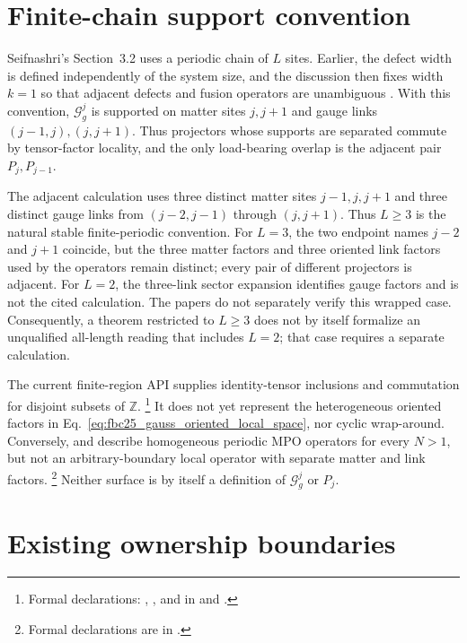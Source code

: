 \documentclass{article}
\begin{document}
\section{Finite-chain support convention}

Seifnashri's Section~3.2 uses a periodic chain of $L$ sites.  Earlier, the
defect width is defined independently of the system size, and the discussion
then fixes width $k=1$ so that adjacent defects and fusion operators are
unambiguous \cite[arXiv source lines~555--584 and 602--760]
{Seifnashri2024LSM}.  With this convention, $\mathcal G^j_g$ is supported on
matter sites $j,j+1$ and gauge links $(j-1,j),(j,j+1)$.  Thus projectors whose
supports are separated commute by tensor-factor locality, and the only
load-bearing overlap is the adjacent pair $P_j,P_{j-1}$.

The adjacent calculation uses three distinct matter sites
$j-1,j,j+1$ and three distinct gauge links from $(j-2,j-1)$ through
$(j,j+1)$.  Thus $L\geq3$ is the natural stable finite-periodic convention.
For $L=3$, the two endpoint names $j-2$ and $j+1$ coincide, but the three
matter factors and three oriented link factors used by the operators remain
distinct; every pair of different projectors is adjacent.  For $L=2$, the
three-link sector expansion identifies gauge factors and is not the cited
calculation.  The papers do not separately verify this wrapped case.
Consequently, a theorem restricted to $L\geq3$ does not by itself formalize an
unqualified all-length reading that includes $L=2$; that case requires a
separate calculation.

The current finite-region API supplies identity-tensor inclusions and
commutation for disjoint subsets of $\mathbb Z$.
\footnote{Formal declarations:
,
, and
 in
 and
.}
It does not yet represent the heterogeneous oriented factors in
Eq.~\ref{eq:fbc25_gauss_oriented_local_space}, nor cyclic wrap-around.
Conversely,  and
 describe homogeneous periodic
MPO operators for every $N>1$, but not an arbitrary-boundary local operator
with separate matter and link factors.
\footnote{Formal declarations are in
.}
Neither surface is by itself a definition of $\mathcal G^j_g$ or $P_j$.

\section{Existing ownership boundaries}
\end{document}
